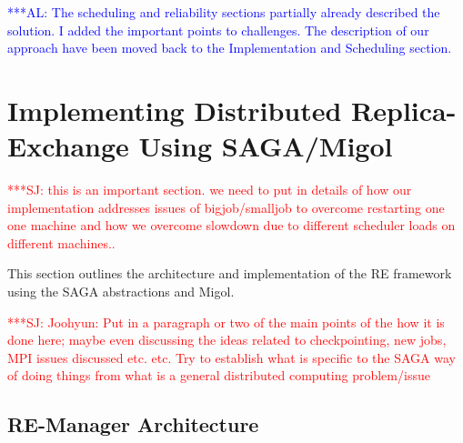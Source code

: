 \documentclass{rspublic}
\newcommand{\alnote}[1]{ {\textcolor{blue} { ***AL: #1 }}}
\newcommand{\jhanote}[1]{ {\textcolor{red} { ***SJ: #1 }}}
\newcommand{\alnote}[1]{}
\newcommand{\jhanote}[1]{}
\begin{document}

\alnote{The scheduling and reliability sections partially already described the solution. 
I added the important points to challenges. The description of our approach have been 
moved back to the Implementation and Scheduling section.}
                         
\section{Implementing Distributed Replica-Exchange Using SAGA/Migol}
\label{sec:remd_impl}
\jhanote{this is an important section. we need to put in details of
  how our implementation addresses issues of bigjob/smalljob to
  overcome restarting one one machine and how we overcome slowdown due
  to different scheduler loads on different machines..}


This section outlines the architecture and implementation of the RE framework
using the SAGA abstractions and Migol.

\jhanote{Joohyun: Put in a paragraph or two of the main points of the
  how it is done here; maybe even discussing the ideas related to
  checkpointing, new jobs, MPI issues discussed etc. etc. Try to
  establish what is specific to the SAGA way of doing things from what
  is a general distributed computing problem/issue}
          
\subsection{RE-Manager Architecture}
\end{document}
